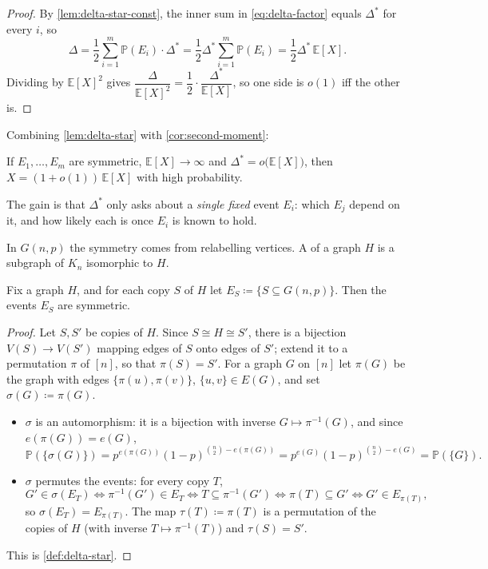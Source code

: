 \begin{proof}
    By \autoref{lem:delta-star-const}, the inner sum in \eqref{eq:delta-factor} equals \(\Delta^{*}\) for every \(i\), so
    \[
        \Delta = \frac{1}{2} \sum_{i=1}^{m} \mathbb{P}(E_i) \cdot \Delta^{*} = \frac{1}{2}\Delta^{*} \sum_{i=1}^{m} \mathbb{P}(E_i) = \frac{1}{2}\Delta^{*}\,\mathbb{E}[X].
    \]
    Dividing by \(\mathbb{E}[X]^{2}\) gives \(\dfrac{\Delta}{\mathbb{E}[X]^{2}} = \dfrac{1}{2} \cdot \dfrac{\Delta^{*}}{\mathbb{E}[X]}\), so one side is \(o(1)\) iff the other is.
\end{proof}

Combining \autoref{lem:delta-star} with \autoref{cor:second-moment}:

\begin{corollary}\label{cor:second-moment-sym}
    If \(E_1, \ldots, E_m\) are symmetric, \(\mathbb{E}[X] \to \infty\) and \(\Delta^{*} = o\bigl( \mathbb{E}[X] \bigr)\), then \(X = (1+o(1))\,\mathbb{E}[X]\) with high probability.
\end{corollary}

The gain is that \(\Delta^{*}\) only asks about a \emph{single fixed} event \(E_i\): which \(E_j\) depend on it, and how likely each is once \(E_i\) is known to hold.

In \(G(n,p)\) the symmetry comes from relabelling vertices. A  of a graph \(H\) is a subgraph of \(K_n\) isomorphic to \(H\).

\begin{lemma}\label{lem:copies-symmetric}
    Fix a graph \(H\), and for each copy \(S\) of \(H\) let \(E_S \coloneqq \{S \subseteq G(n,p)\}\). Then the events \(E_S\) are symmetric.
\end{lemma}

\begin{proof}
    Let \(S, S'\) be copies of \(H\). Since \(S \cong H \cong S'\), there is a bijection \(V(S) \to V(S')\) mapping edges of \(S\) onto edges of \(S'\); extend it to a permutation \(\pi\) of \([n]\), so that \(\pi(S) = S'\). For a graph \(G\) on \([n]\) let \(\pi(G)\) be the graph with edges \(\{\pi(u), \pi(v)\}\), \(\{u,v\} \in E(G)\), and set \(\sigma(G) \coloneqq \pi(G)\).
    \begin{itemize}
        \item \(\sigma\) is an automorphism: it is a bijection with inverse \(G \mapsto \pi^{-1}(G)\), and since \(e(\pi(G)) = e(G)\),
        \[
            \mathbb{P}(\{\sigma(G)\}) = p^{e(\pi(G))}(1-p)^{\binom{n}{2} - e(\pi(G))} = p^{e(G)}(1-p)^{\binom{n}{2} - e(G)} = \mathbb{P}(\{G\}).
        \]
        \item \(\sigma\) permutes the events: for every copy \(T\),
        \[
            G' \in \sigma(E_T) \iff \pi^{-1}(G') \in E_T \iff T \subseteq \pi^{-1}(G') \iff \pi(T) \subseteq G' \iff G' \in E_{\pi(T)},
        \]
        so \(\sigma(E_T) = E_{\pi(T)}\). The map \(\tau(T) \coloneqq \pi(T)\) is a permutation of the copies of \(H\) (with inverse \(T \mapsto \pi^{-1}(T)\)) and \(\tau(S) = S'\).
    \end{itemize}
    This is \autoref{def:delta-star}.
\end{proof}

